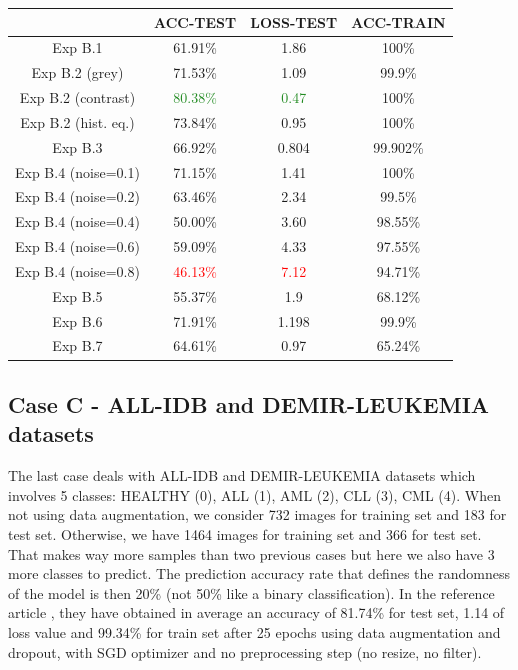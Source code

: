 \documentclass[11pt, openany]{report}
\theoremstyle{plain}
\theoremstyle{definition}
\theoremstyle{remark}
\begin{document}
\begin{center}
\begin{tabular}{|c|c|c|c|}
  \hline
          & \textbf{ACC-TEST} & \textbf{LOSS-TEST} & \textbf{ACC-TRAIN} \\
  \hline
  Exp B.1 & 61.91\% & 1.86 & 100\% \\
  \hline
  Exp B.2 (grey) & 71.53\% & 1.09 & 99.9\%  \\ 
  Exp B.2 (contrast) & \textcolor{ForestGreen}{80.38\%} & \textcolor{ForestGreen}{0.47} & 100\% \\ 
  Exp B.2 (hist. eq.) & 73.84\% & 0.95 & 100\% \\ 
  \hline
  Exp B.3 & 66.92\% & 0.804 & 99.902\% \\
  \hline
  Exp B.4 (noise=0.1) & 71.15\% & 1.41 & 100\%  \\ 
  Exp B.4 (noise=0.2) & 63.46\% & 2.34 & 99.5\% \\ 
  Exp B.4 (noise=0.4) & 50.00\% & 3.60 & 98.55\% \\
  Exp B.4 (noise=0.6) & 59.09\% & 4.33 & 97.55\%  \\ 
  Exp B.4 (noise=0.8) & \textcolor{red}{46.13\%} & \textcolor{red}{7.12} & 94.71\% \\
  \hline 
  Exp B.5 & 55.37\% & 1.9 & 68.12\% \\
  \hline
  Exp B.6 & 71.91\% & 1.198 & 99.9\% \\
  \hline
  Exp B.7 & 64.61\% & 0.97 & 65.24\% \\ 
  \hline
\end{tabular}
\label{table:summary-allidb2}
\end{center}


\subsection{Case C - ALL-IDB and DEMIR-LEUKEMIA datasets}

The last case deals with ALL-IDB and DEMIR-LEUKEMIA datasets which involves 5 classes: HEALTHY (0), ALL (1), AML (2), CLL (3), CML (4). When not using data augmentation, we consider 732 images for training set and 183 for test set. Otherwise, we have 1464 images for training set and 366 for test set. That makes way more samples than two previous cases but here we also have 3 more classes to predict. The prediction accuracy rate that defines the randomness of the model is then 20\% (not 50\% like a binary classification). In the reference article \cite{leukemia}, they have obtained in average an accuracy of 81.74\% for test set, 1.14 of loss value and 99.34\% for train set after 25 epochs using data augmentation and dropout, with SGD optimizer and no preprocessing step (no resize, no filter).    
\end{document}
